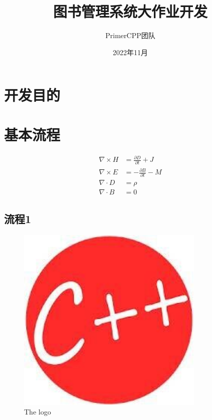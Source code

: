 \documentclass[cite=numbers,lang=cn]{elegantpaper}
\author{PrimerCPP团队}
\title{图书管理系统大作业开发}
\date{2022年11月}
\begin{document}
    \makecover
    \maketitle

    \section{开发目的}

    \section{基本流程}

    \begin{align}
        \nabla \times H &= \frac{\partial D}{\partial t} + J\\
        \nabla \times E &= -\frac{\partial B }{\partial t} - M\\
        \nabla \cdot D &= \rho\\
        \nabla \cdot B &= 0
    \end{align}

    \subsection*{流程1}

    \begin{figure}[htbp]
        \centering
        \includegraphics[width=0.8\textwidth]{logo.jpg}
        \caption{The logo}
    \end{figure}


    \newpage
\end{document}
